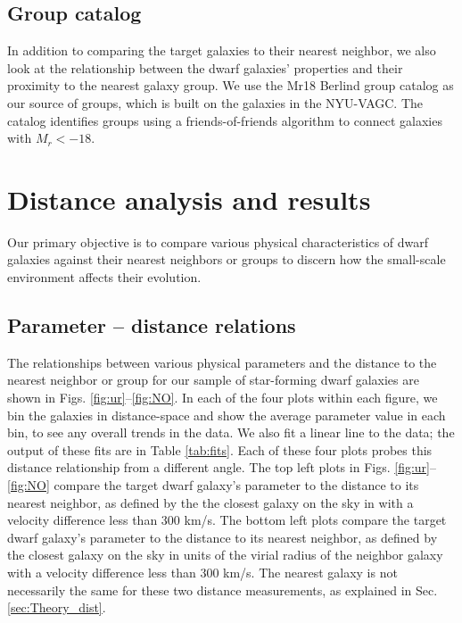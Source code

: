 \subsection{Group catalog}

In addition to comparing the target galaxies to their nearest neighbor, we also 
look at the relationship between the dwarf galaxies' properties and their 
proximity to the nearest galaxy group.  We use the Mr18 Berlind group catalog 
\cite{Berlind06} as our source of groups, which is built on the galaxies in the 
NYU-VAGC. The catalog identifies groups using a friends-of-friends algorithm 
\citep{Huchra82} to connect galaxies with $M_r < -18$.




\section[Results]{Distance analysis and results}

Our primary objective is to compare various physical characteristics of dwarf 
galaxies against their nearest neighbors or groups to discern how the 
small-scale environment affects their evolution.


\subsection{Parameter -- distance relations}\label{sec:Relations}

The relationships between various physical parameters and the distance to the 
nearest neighbor or group for our sample of star-forming dwarf galaxies are 
shown in Figs. \ref{fig:ur}--\ref{fig:NO}.  In each of the four plots within 
each figure, we bin the galaxies in distance-space and show the average 
parameter value in each bin, to see any overall trends in the data.  We also fit 
a linear line to the data; the output of these fits are in Table \ref{tab:fits}.  
Each of these four plots probes this distance relationship from a different 
angle.  The top left plots in Figs. \ref{fig:ur}--\ref{fig:NO} compare the 
target dwarf galaxy's parameter to the distance to its nearest neighbor, as 
defined by the the closest galaxy on the sky in \hMpc with a velocity difference 
less than 300 km/s.  The bottom left plots compare the target dwarf galaxy's 
parameter to the distance to its nearest neighbor, as defined by the closest 
galaxy on the sky in units of the virial radius of the neighbor galaxy with a 
velocity difference less than 300 km/s.  The nearest galaxy is not necessarily 
the same for these two distance measurements, as explained in Sec. 
\ref{sec:Theory_dist}.

